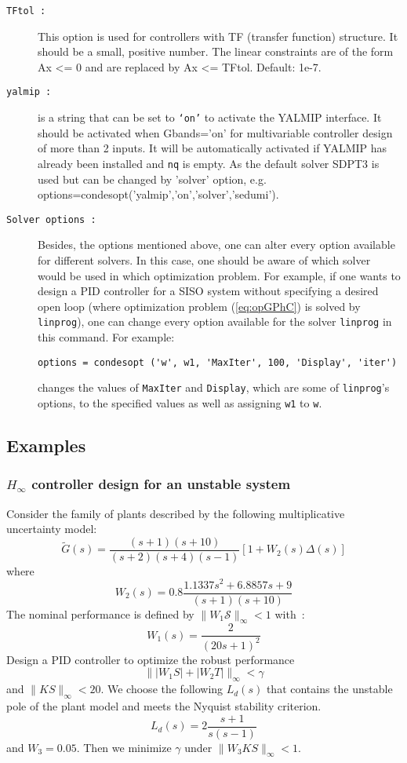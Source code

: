 \documentclass [12pt , a4paper] {report}
\begin{document}
\begin{description}
\item[\texttt{TFtol :}] This option is used for controllers with TF (transfer
function) structure. It should be a small, positive number.
The linear constraints are of the form Ax <= 0 and are 
replaced by Ax <= TFtol. Default: 1e-7.

 \item[{\tt yalmip :}]   is a string that can be set to {\tt `on'} to activate the YALMIP interface. It should be activated when  Gbands='on' for multivariable controller design of more than 2 inputs. It will be automatically activated if YALMIP has already been installed and {\tt nq} is empty. As  the default solver SDPT3 is used  but can be changed by 'solver' option, e.g. options=condesopt('yalmip','on','solver','sedumi').

\item[\texttt{Solver options :}] Besides, the options mentioned above, one can alter every option available for different solvers. In this case, one should be aware of which solver would be used in which optimization problem. For example, if one wants to design a PID controller for a SISO system without specifying a desired open loop (where optimization problem (\ref{eq:opGPhC}) is solved by \texttt{linprog}), one can change every option available for the solver \texttt{linprog} in this command. For example:
\begin{lstlisting}
options = condesopt ('w', w1, 'MaxIter', 100, 'Display', 'iter')
\end{lstlisting}
changes the values of \texttt{MaxIter} and \texttt{Display}, which are some of \texttt{linprog}'s options, to the specified values as well as assigning \texttt{w1} to \texttt{w}.

\end{description}


\subsection{Examples}

\subsubsection{$H_\infty$ controller design for an unstable system}

Consider  the family of plants described by the following multiplicative uncertainty model:
$$
	\tilde{G}(s)=\frac{(s+1)(s+10)}{(s+2)(s+4)(s-1)}[1+ W_2(s)\Delta(s)] 
$$
where 
$$
	W_2(s)=0.8\frac{1.1337s^2+6.8857s+9}{(s+1)(s+10)}
$$
The nominal performance is defined by $\| W_1 \mathcal{S} \|_\infty < 1$ with~: 
$$
	W_1(s)=\frac{2}{(20s+1)^2}
$$
Design a PID controller  to optimize  the robust performance
$$ \| |W_1 S| +  |W_2 T| \|_\infty < \gamma $$
and $\| KS \|_\infty < 20$. We choose the following $L_d(s)$ that contains the unstable pole of the plant model and meets the Nyquist stability criterion.
$$L_d(s)=2 \frac{s+1}{s(s-1)}$$
and $W_3=0.05$. Then we minimize $\gamma$ under $\| W_3 KS \|_\infty < 1$.
\end{document}
